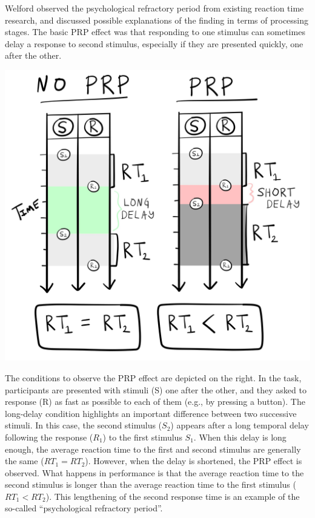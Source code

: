 \documentclass[
  oneside,
  12pt]{crumpbook}
\newenvironment{floatright50}{%
  \wrapfigure{R}{.5\textwidth}%
  }{%
  \endwrapfigure}
\begin{document}
Welford observed the psychological refractory period from existing reaction time research, and discussed possible explanations of the finding in terms of processing stages. The basic PRP effect was that responding to one stimulus can sometimes delay a response to second stimulus, especially if they are presented quickly, one after the other.

\begin{floatright50}
\includegraphics[width=1\linewidth]{imgs/PRP_effect}

\end{floatright50}

The conditions to observe the PRP effect are depicted on the right. In the task, participants are presented with stimuli (S) one after the other, and they asked to response (R) as fast as possible to each of them (e.g., by pressing a button). The long-delay condition highlights an important difference between two successive stimuli. In this case, the second stimulus (\(S_2\)) appears after a long temporal delay following the response (\(R_1\)) to the first stimulus \(S_1\). When this delay is long enough, the average reaction time to the first and second stimulus are generally the same (\(RT_1 = RT_2\)). However, when the delay is shortened, the PRP effect is observed. What happens in performance is that the average reaction time to the second stimulus is longer than the average reaction time to the first stimulus (\(RT_1 < RT_2\)). This lengthening of the second response time is an example of the so-called ``psychological refractory period''.
\end{document}
